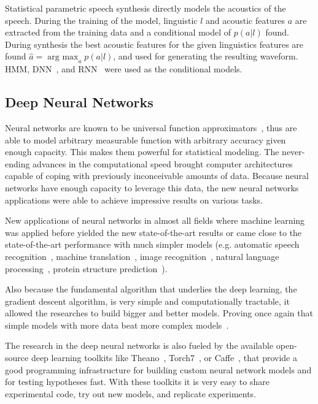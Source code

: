 \documentclass[runningheads,a4paper]{llncs}
\begin{document}
Statistical parametric speech synthesis directly models the acoustics of the speech. During the training of the model, linguistic $l$ and acoustic features $a$ are extracted from the training data and a conditional model of $p(a|l)$ found. During synthesis the best acoustic features for the given linguistics features are found $\hat{a}=\operatorname{arg~max}_a p(a|l)$, and used for generating the resulting waveform. HMM\cite{yoshimuray1999simultaneous}, DNN~\cite{ze2013statistical}, and RNN~\cite{zen2015unidirectional} were used as the conditional models.

\subsection{Deep Neural Networks}
Neural networks are known to be universal function approximators~\cite{hornik1989multilayer}, thus are able to model arbitrary measurable function with arbitrary accuracy given enough capacity. This makes them powerful for statistical modeling. The never-ending advances in the computational speed brought computer architectures capable of coping with previously inconceivable amounts of data. Because neural networks have enough capacity to leverage this data, the new neural networks applications were able to achieve impressive results on various tasks.

New applications of neural networks in almost all fields where machine learning was applied before yielded the new state-of-the-art results or came close to the state-of-the-art performance with much simpler models (e.g. automatic speech recognition~\cite{graves2005framewise}, machine translation~\cite{sutskever2014sequence}, image recognition~\cite{karpathy2014deep}, natural language processing~\cite{socher2012semantic}, protein structure prediction~\cite{sonderby2014protein}).

Also because the fundamental algorithm that underlies the deep learning, the gradient descent algorithm, is very simple and computationally tractable, it allowed the researches to build bigger and better models. Proving once again that simple models with more data beat more complex models~\cite{halevy2009unreasonable}.

The research in the deep neural networks is also fueled by the available open-source deep learning toolkits like Theano~\cite{bastien2012theano}, Torch7~\cite{collobert2011torch7}, or Caffe~\cite{jia2014caffe}, that provide a good programming infrastructure for building custom neural network models and for testing hypotheses fast. With these toolkits it is very easy to share experimental code, try out new models, and replicate experiments.
\end{document}

